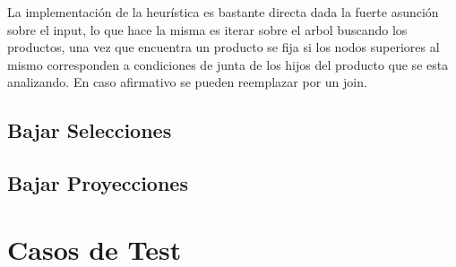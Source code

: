 \documentclass[a4paper,11pt]{article}
\begin{document}
La implementación de la heurística es bastante directa dada la fuerte asunción sobre el input, lo que hace la misma es iterar sobre el arbol buscando los productos, una vez que encuentra un producto se fija si los nodos superiores al mismo corresponden a condiciones de junta de los hijos del producto que se esta analizando. En caso afirmativo se pueden reemplazar por un join. 

\subsection{Bajar Selecciones}

\subsection{Bajar Proyecciones}






\section{Casos de Test}
\end{document}
